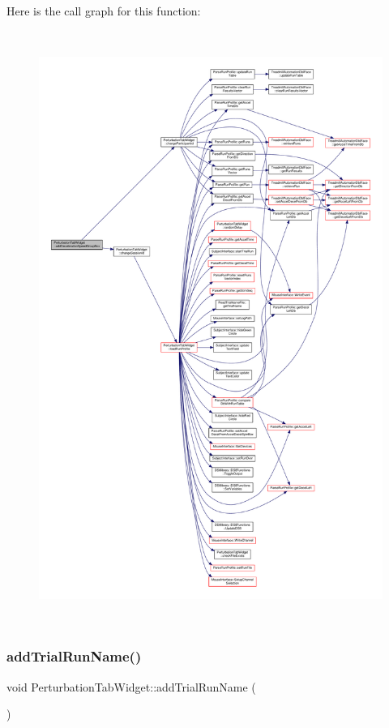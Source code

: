 Here is the call graph for this function\+:
\nopagebreak
\begin{figure}[H]
\begin{center}
\leavevmode
\includegraphics[height=550pt]{class_perturbation_tab_widget_ad9a685f191ca94bdc47f148273fdf1f4_cgraph}
\end{center}
\end{figure}
\mbox{\label{class_perturbation_tab_widget_a237937a4a9bd3724fe615d0b5a7b5638}} 
\subsubsection{\texorpdfstring{add\+Trial\+Run\+Name()}{addTrialRunName()}}
{\footnotesize\ttfamily void Perturbation\+Tab\+Widget\+::add\+Trial\+Run\+Name (\begin{DoxyParamCaption}{ }\end{DoxyParamCaption})}



